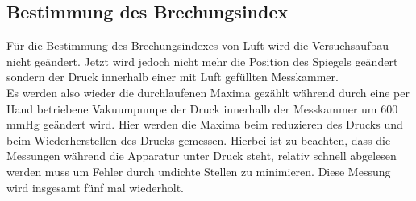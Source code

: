     \subsection{Bestimmung des Brechungsindex}

        \noindent Für die Bestimmung des Brechungsindexes von Luft wird die Versuchsaufbau nicht geändert. Jetzt wird jedoch nicht mehr die Position 
        des Spiegels geändert sondern der Druck innerhalb einer mit Luft gefüllten Messkammer.\\ Es werden also wieder die durchlaufenen Maxima 
        gezählt während durch eine per Hand betriebene Vakuumpumpe der Druck innerhalb der Messkammer um 600 mmHg geändert wird. Hier werden 
        die Maxima beim reduzieren des Drucks und beim Wiederherstellen des Drucks gemessen. Hierbei ist zu beachten, dass die Messungen während 
        die Apparatur unter Druck steht, relativ schnell abgelesen werden muss um Fehler durch undichte Stellen zu minimieren. Diese Messung 
        wird insgesamt fünf mal wiederholt.


    

